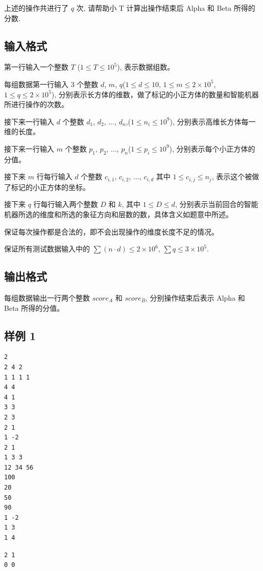 上述的操作共进行了 $q$ 次, 请帮助小 T 计算出操作结束后 Alpha 和 Beta 所得的分数.

\subsection{输入格式}

第一行输入一个整数 $T$ ($1 \le T \le 10^5$), 表示数据组数。

每组数据第一行输入 3 个整数 $d$, $m$, $q$($1 \le d \le 10$, $1 \le m \le 2 \times 10^5$, $1 \le q \le 2 \times 10^5$), 分别表示长方体的维数，做了标记的小正方体的数量和智能机器所进行操作的次数。

接下来一行输入 $d$ 个整数 $d_1$, $d_2$, $\ldots$, $d_{n}$,($1 \le n_i \le 10^9$), 分别表示高维长方体每一维的长度。

接下来一行输入 $m$ 个整数 $p_1$, $p_2$, $\ldots$, $p_n$($1 \le p_i \le 10^9$), 分别表示每个小正方体的分值。

接下来 $m$ 行每行输入 $d$ 个整数 $c_{i, 1}$, $c_{i, 2}$, $\ldots$, $c_{i, d}$ 其中 $1 \le c_{i, j} \le n_j$, 表示这个被做了标记的小正方体的坐标。

接下来 $q$ 行每行输入两个整数 $D$ 和 $k$, 其中 $1 \le D \le d$, 分别表示当前回合的智能机器所选的维度和所选的象征方向和层数的数，具体含义如题意中所述。

保证每次操作都是合法的，即不会出现操作的维度长度不足的情况。

保证所有测试数据输入中的 $\sum (n \cdot d) \le 2 \times 10^6$, $\sum q \le  3 \times 10^5$.

\subsection{输出格式}

每组数据输出一行两个整数 $score_A$ 和 $score_B$, 分别操作结束后表示 Alpha 和 Beta 所得的分值。

\subsection{样例 1}
\begin{minipage}{\linewidth}
   \begin{minipage}[t]{0.49\linewidth}
      \begin{lstlisting}[title=\texttt{standard input}]
2
2 4 2
1 1 1 1
4 4
4 1
3 3
2 3
2 1
1 -2
2 1
1 3 3
12 34 56
100
20
50
90
1 -2
1 3
1 4
\end{lstlisting}
   \end{minipage}
   \begin{minipage}[t]{0.49\linewidth}
      \begin{lstlisting}[title=\texttt{standard output}]
2 1
0 0
\end{lstlisting}
   \end{minipage}
\end{minipage}


